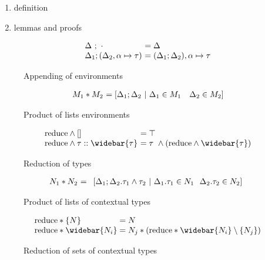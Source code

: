 \documentclass[sigplan,screen]{acmart}
\begin{document}
\begin{enumerate}
  \item definition 
  \item lemmas and proofs 
\end{enumerate}

\begin{figure*}[h]
  \[
    \begin{array}{l @{} l}
    \Delta\ ;\ \cdot
    &\ = \Delta 
    \\
    \Delta_1;(\Delta_2,\alpha \mapsto \tau) 
    &\ = (\Delta_1;\Delta_2),\alpha \mapsto \tau
    \end{array}
  \]

  \caption{Appending of environments}
\end{figure*}

\begin{figure*}[h]
  \[
    \begin{array}{l @{} l}
    M_1 * M_2 
    &\ = 
    [\Delta_1 ; \Delta_2 \ |\ 
      \Delta_1 \in M_1
      \ \ \  
      \Delta_2 \in M_2
    ]
    \end{array}
  \]

  \caption{Product of lists environments}
\end{figure*}

\begin{figure*}[h]
  \[
    \begin{array}{l @{} l}
    \text{reduce} \wedge [] 
    &\ = \top
    \\
    \text{reduce} \wedge \tau::\widebar{\tau}
    &\ = \tau\ \wedge (\text{reduce} \wedge \widebar{\tau})
    \end{array}
  \]

  \caption{Reduction of types}
\end{figure*}

\begin{figure*}[h]
  \[
    \begin{array}{l @{} l}
      N_1 * N_2
      &\ = 
      \begin{array}[t]{l}
        [ \Delta_1 ; \Delta_2 . \tau_1 \wedge \tau_2 \ |\ 
          \Delta_1.\tau_1 \in N_1
          \ \ 
          \Delta_2.\tau_2 \in N_2
        ]
      \end{array}
    \end{array}
  \]

  \caption{Product of lists of contextual types}
\end{figure*}

\begin{figure*}[h]
  \[
    \begin{array}{l @{}l}
    \text{reduce} * \{N\}
    & {}= N
    \\
    \text{reduce} * \widebar{N_i}
    & {}= N_j * (\text{reduce} * \widebar{N_i}\setminus\{N_j\})
    \end{array}
  \]

  \caption{Reduction of sets of contextual types}
\end{figure*}
\end{document}
